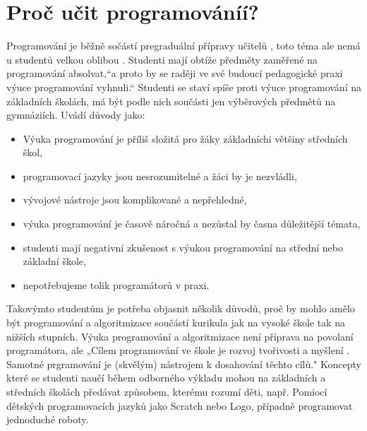 \documentclass[FP,DP]{tulthesis}
\begin{document}
{{{{{{{\section{Proč učit programováníí?}

Programování je běžně sočástí  pregraduální  přípravy učitelů \citep{berki2013}, toto téma ale nemá u studentů velkou oblibou \citep{fojtik2015}. Studenti mají obtíže předměty zaměřené na programování absolvat,“a proto by se raději ve své budoucí pedagogické praxi výuce programování vyhnuli.“ \citep[s.~54 ]{fojtik2015} Studenti se staví spíše proti výuce programování na základních školách, má být podle nich součásti jen výběrových předmětů na gymnáziích. Uvádí důvody jako:
\vspace{2mm}\begin{itemize}[nosep]
  	\item Výuka programování je příliš složitá pro žáky základníchi většiny středních škol,
	\item programovací jazyky jsou nesrozumitelné a žáci by je nezvládli,
	\item vývojové nástroje jsou komplikované a nepřehledné,
	\item výuka programování je časově náročná a nezůstal by časna důležitější témata,
	\item studenti mají negativní zkušenost s výukou programování na střední nebo základní škole,
	\item nepotřebujeme tolik programátorů v praxi.
\end{itemize}
\vspace{2mm}Takovýmto studentům je potřeba objasnit několik důvodů, proč by mohlo amělo být programování a algoritmizace součástí kurikula jak na vysoké škole tak na nižších stupních.  \citep[s.~54 ]{fojtik2015}
Výuka programování a algoritmizace není příprava na povolaní programátora, ale „Cílem programování ve škole je rozvoj tvořivosti a myšlení . Samotné prgramování je (skvělým) nástrojem k dosahování těchto cílů." \citep{lessner2015} Koncepty které se studenti naučí během odborného výkladu mohou na základních a středních školách předávat způsobem, kterému rozumí děti, např. Pomiocí dětských programovacích jazyků jako Scratch nebo Logo, případně programovat jednoduché roboty.

}}}}}}}
\end{document}
